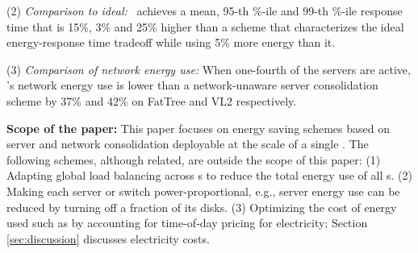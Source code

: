 (2) \emph{Comparison to ideal:}  \shrink\ achieves a mean, 95-th \%-ile and 99-th \%-ile response time that is 15\%, 3\% and 25\% higher than a scheme that characterizes the ideal energy-response time tradeoff while using 5\% more energy than it.

(3) \emph{Comparison of network energy use:} When one-fourth of the servers are active, \shrink's network energy use is lower than a network-unaware server consolidation scheme by 37\% and 42\% on FatTree \cite{fattree} and VL2 \cite{vl2} respectively.

\textbf{Scope of the paper:} This paper focuses on energy saving schemes based on server and network consolidation deployable at the scale of a single \cdc. The following schemes, although related, are outside the scope of this paper: (1) Adapting global load balancing across \cdc s to reduce the total energy use of all \cdc s. (2) Making each server or switch power-proportional, e.g., server energy use can be reduced by turning off a fraction of its disks. (3) Optimizing the cost of energy used such as by accounting for time-of-day pricing for electricity; Section \ref{sec:discussion} discusses electricity costs.





